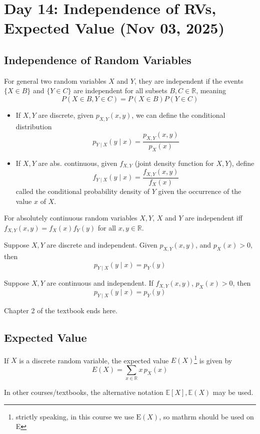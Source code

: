 \section{Day 14: Independence of RVs, Expected Value (Nov 03, 2025)}

\subsection{Independence of Random Variables}

\begin{definition}
For general two random variables $X$ and $Y$, they are independent if the events $\{ X \in B \}$ and $\{ Y \in C \}$ are independent for all subsets $B, C \in \mathbb{R}$, meaning
\[
    P(X \in B, Y \in C) = P(X \in B)P(Y \in C)
\]
\begin{itemize}
\item    If $X, Y$ are discrete, given $p_{X, Y}(x, y)$, we can define the conditional distribution
\[
    p_{Y \mid X}(y \mid x) = \frac{p_{X, Y}(x, y)}{p_X(x)}
\]
\item    If $X, Y$ are abs. continuous, given $f_{X, Y}$ (joint density function for $X, Y$), define
\[
    f_{Y \mid X}(y \mid x) = \frac{f_{X, Y}(x, y)}{f_X(x)}
\]
called the conditional probability density of $Y$ given the occurrence of the value $x$ of $X$. 
\end{itemize}
\end{definition}

\begin{simplethm}
    For absolutely continuous random variables $X, Y$, $X$ and $Y$ are independent iff $f_{X, Y}(x, y) = f_X(x)f_Y(y)$ for all $x, y \in \mathbb{R}$. 
\end{simplethm}

\begin{simplethm}
    Suppose $X, Y$ are discrete and independent. Given $p_{X, Y}(x, y)$, and $p_X(x) > 0$, then 
    \[
        p_{Y \mid X}(y \mid x) = p_Y(y)
    \]
\end{simplethm}

\begin{simplethm}
    Suppose $X, Y$ are continuous and independent. If $f_{X, Y}(x, y)$, $p_X(x) > 0$, then 
    \[
        p_{Y \mid X}(y \mid x) = p_Y(y)
    \]
\end{simplethm}

\noindent Chapter 2 of the textbook ends here.

\subsection{Expected Value}

\begin{definition}
    If $X$ is a discrete random variable, the expected value $E(X)$\footnote{strictly speaking, in this course we use $\mathrm{E}(X)$, so mathrm should be used on E} is given by
    \[
    E(X) = \sum_{x \in \mathbb{R}} x \, p_X(x)
    \]
\end{definition}

\noindent In other courses/textbooks, the alternative notation $\mathbb{E}[X], \mathbb{E}(X)$ may be used. 
